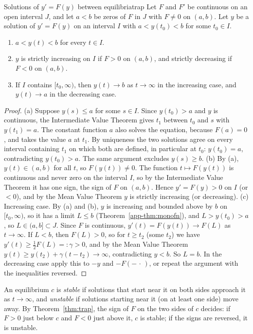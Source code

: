 \documentclass[11pt]{article}
\begin{document}
\begin{thm}{Solutions of $y'=F(y)$ between equilibria}{trap}
Let $F$ and $F'$ be continuous on an open interval $J$, and let $a<b$ be zeros of $F$ in $J$ with $F\ne0$ on $(a,b)$. Let $y$ be a solution of $y'=F(y)$ on an interval $I$ with $a<y(t_0)<b$ for some $t_0\in I$.
\begin{enumerate}[label=(\alph*),nosep]
  \item $a<y(t)<b$ for every $t\in I$.
  \item $y$ is strictly increasing on $I$ if $F>0$ on $(a,b)$, and strictly decreasing if $F<0$ on $(a,b)$.
  \item If $I$ contains $[t_0,\infty)$, then $y(t)\to b$ as $t\to\infty$ in the increasing case, and $y(t)\to a$ in the decreasing case.
\end{enumerate}
\end{thm}
\begin{proof}
(a) Suppose $y(s)\le a$ for some $s\in I$. Since $y(t_0)>a$ and $y$ is continuous, the Intermediate Value Theorem gives $t_1$ between $t_0$ and $s$ with $y(t_1)=a$. The constant function $a$ also solves the equation, because $F(a)=0$, and takes the value $a$ at $t_1$. By uniqueness the two solutions agree on every interval containing $t_1$ on which both are defined, in particular at $t_0$: $y(t_0)=a$, contradicting $y(t_0)>a$. The same argument excludes $y(s)\ge b$.
(b) By (a), $y(t)\in(a,b)$ for all $t$, so $F(y(t))\ne0$. The function $t\mapsto F(y(t))$ is continuous and never zero on the interval $I$, so by the Intermediate Value Theorem it has one sign, the sign of $F$ on $(a,b)$. Hence $y'=F(y)>0$ on $I$ (or $<0$), and by the Mean Value Theorem $y$ is strictly increasing (or decreasing).
(c) Increasing case. By (a) and (b), $y$ is increasing and bounded above by $b$ on $[t_0,\infty)$, so it has a limit $L\le b$ (Theorem~\ref{app-thm:monofn}), and $L>y(t_0)>a$, so $L\in(a,b]\subset J$. Since $F$ is continuous, $y'(t)=F(y(t))\to F(L)$ as $t\to\infty$. If $L<b$, then $F(L)>0$, so for $t\ge t_2$ (some $t_2$) we have $y'(t)\ge\frac12F(L)=:\gamma>0$, and by the Mean Value Theorem $y(t)\ge y(t_2)+\gamma(t-t_2)\to\infty$, contradicting $y<b$. So $L=b$. In the decreasing case apply this to $-y$ and $-F(-\,\cdot\,)$, or repeat the argument with the inequalities reversed.
\end{proof}

An equilibrium $c$ is \emph{stable} if solutions that start near it on both sides approach it as $t\to\infty$, and \emph{unstable} if solutions starting near it (on at least one side) move away. By Theorem~\ref{thm:trap}, the sign of $F$ on the two sides of $c$ decides: if $F>0$ just below $c$ and $F<0$ just above it, $c$ is stable; if the signs are reversed, it is unstable.
\end{document}

